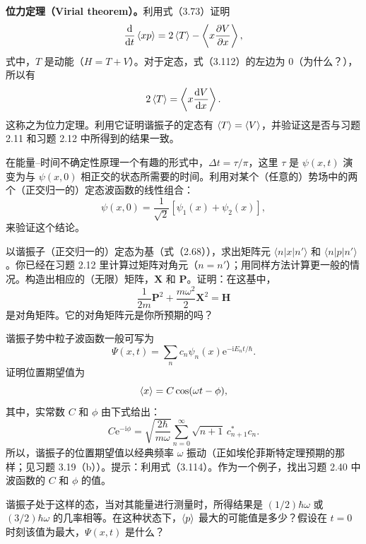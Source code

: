 \textbf{位力定理（Virial theorem）。}利用式（3.73）证明
\[
\frac{\mathrm{d}}{\mathrm{d} t}\left\langle xp\right\rangle=2\left\langle T\right\rangle-\left\langle x\frac{\partial V}{\partial x}\right\rangle,
\]
式中，$T$ 是动能（$H=T+V$）。对于定态，式（3.112）的左边为 $0$（为什么？），所以有
\[
2\left\langle T\right\rangle=\left\langle x\frac{\mathrm{d} V}{\mathrm{d} x}\right\rangle.
\]
这称之为位力定理。利用它证明谐振子的定态有 $\left\langle T\right\rangle=\left\langle V\right\rangle$，并验证这是否与习题 2.11 和习题 2.12 中所得到的结果一致。
\vfill

在能量--时间不确定性原理一个有趣的形式中，$\Delta t=\tau/\pi$，这里 $\tau$ 是 $\psi(x,t)$ 演变为与 $\psi(x,0)$ 相正交的状态所需要的时间。利用对某个（任意的）势场中的两个（正交归一的）定态波函数的线性组合：
\[
\psi(x,0)=\frac{1}{\sqrt{2}}[\psi_1(x)+\psi_2(x)],
\]
来验证这个结论。
\vfill

以谐振子（正交归一的）定态为基（式（2.68）），求出矩阵元 $\langle n|x|n'\rangle$ 和 $\langle n|p|n'\rangle$。你已经在习题 2.12 里计算过矩阵对角元（$n=n'$）；用同样方法计算更一般的情况。构造出相应的（无限）矩阵，$\boldsymbol X$ 和 $\boldsymbol P$。证明：在这基中，
\[
\frac{1}{2m}\boldsymbol P^2+\frac{m\omega^2}{2}\boldsymbol X^2=\boldsymbol H
\]
是对角矩阵。它的对角矩阵元是你所预期的吗？
\vfill

谐振子势中粒子波函数一般可写为
\[
\Psi(x,t)=\sum_n c_n\psi_n(x)\mathrm{e}^{-\mathrm{i}E_nt/\hbar}.
\]
证明位置期望值为
\[
\left\langle x\right\rangle=C\cos(\omega t-\phi),
\]
其中，实常数 $C$ 和 $\phi$ 由下式给出：
\[
C\mathrm{e}^{-\mathrm{i}\phi}
=\sqrt{\frac{2\hbar}{m\omega}}\sum_{n=0}^{\infty}\sqrt{n+1}\,c_{n+1}^*c_n.
\]
所以，谐振子的位置期望值以经典频率 $\omega$ 振动（正如埃伦菲斯特定理预期的那样；见习题 3.19（b））。提示：利用式（3.114）。作为一个例子，找出习题 2.40 中波函数的 $C$ 和 $\phi$ 的值。
\vfill

谐振子处于这样的态，当对其能量进行测量时，所得结果是 $(1/2)\hbar\omega$ 或 $(3/2)\hbar\omega$ 的几率相等。在这种状态下，$\left\langle p\right\rangle$ 最大的可能值是多少？假设在 $t=0$ 时刻该值为最大，$\Psi(x,t)$ 是什么？
\vfill

